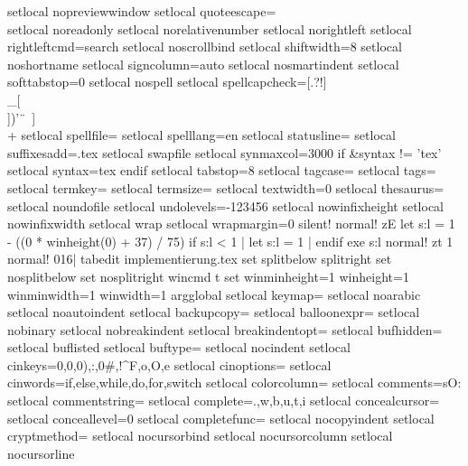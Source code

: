 {{{{{setlocal nopreviewwindow
setlocal quoteescape=\\
setlocal noreadonly
setlocal norelativenumber
setlocal norightleft
setlocal rightleftcmd=search
setlocal noscrollbind
setlocal shiftwidth=8
setlocal noshortname
setlocal signcolumn=auto
setlocal nosmartindent
setlocal softtabstop=0
setlocal nospell
setlocal spellcapcheck=[.?!]\\_[\\])'\"\	\ ]\\+
setlocal spellfile=
setlocal spelllang=en
setlocal statusline=
setlocal suffixesadd=.tex
setlocal swapfile
setlocal synmaxcol=3000
if &syntax != 'tex'
setlocal syntax=tex
endif
setlocal tabstop=8
setlocal tagcase=
setlocal tags=
setlocal termkey=
setlocal termsize=
setlocal textwidth=0
setlocal thesaurus=
setlocal noundofile
setlocal undolevels=-123456
setlocal nowinfixheight
setlocal nowinfixwidth
setlocal wrap
setlocal wrapmargin=0
silent! normal! zE
let s:l = 1 - ((0 * winheight(0) + 37) / 75)
if s:l < 1 | let s:l = 1 | endif
exe s:l
normal! zt
1
normal! 016|
tabedit implementierung.tex
set splitbelow splitright
set nosplitbelow
set nosplitright
wincmd t
set winminheight=1 winheight=1 winminwidth=1 winwidth=1
argglobal
setlocal keymap=
setlocal noarabic
setlocal noautoindent
setlocal backupcopy=
setlocal balloonexpr=
setlocal nobinary
setlocal nobreakindent
setlocal breakindentopt=
setlocal bufhidden=
setlocal buflisted
setlocal buftype=
setlocal nocindent
setlocal cinkeys=0{,0},0),:,0#,!^F,o,O,e
setlocal cinoptions=
setlocal cinwords=if,else,while,do,for,switch
setlocal colorcolumn=
setlocal comments=sO:%
setlocal commentstring=%
setlocal complete=.,w,b,u,t,i
setlocal concealcursor=
setlocal conceallevel=0
setlocal completefunc=
setlocal nocopyindent
setlocal cryptmethod=
setlocal nocursorbind
setlocal nocursorcolumn
setlocal nocursorline
}}}}}
